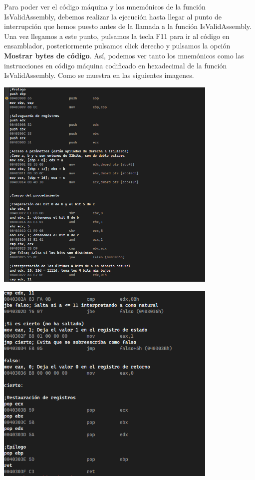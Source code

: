 \documentclass[11pt,a4paper]{article}
\begin{document}
\indent Para poder ver el código máquina y los mnemónicos de la función IsValidAssembly, debemos realizar la ejecución hasta llegar
al punto de interrupción que hemos puesto antes de la llamada a la función IsValidAssembly. Una vez llegamos a este punto, pulsamos la 
tecla F11 para ir al código en ensamblador, posteriormente pulsamos click derecho y pulsamos la opción \textbf{Mostrar bytes de código}. 
Así, podemos ver tanto los mnemónicos como las instrucciones en código máquina codificado en hexadecimal de la función IsValidAssembly. Como se muestra en las siguientes imagenes.
\begin{center}
  \includegraphics[width=0.8\textwidth]{codigomaquina2.png}
  \end{center}
\begin{center}
  \includegraphics[width= 0.8\textwidth]{codigomaquina1 (1).png}
  \end{center}
\newpage
\end{document}
